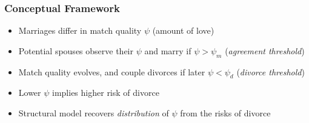 \documentclass[aspectratio=169]{beamer}
\let\olditem\item
\renewcommand{\item}{%
\olditem\vspace{\fill}}
\begin{document}
\begin{frame}
\frametitle{Conceptual Framework}
\begin{itemize}
\item Marriages differ in match quality $\psi$ (amount of love)
\item Potential spouses observe their $\psi$ and marry if $\psi > \psi_m$ (\textit{agreement threshold})
\item Match quality evolves, and couple divorces if later $\psi < \psi_d$ (\textit{divorce threshold})
\item Lower $\psi$ implies higher risk of divorce
\item Structural model recovers \textit{distribution} of $\psi$ from the risks of divorce
\end{itemize}
\end{frame}
\end{document}
